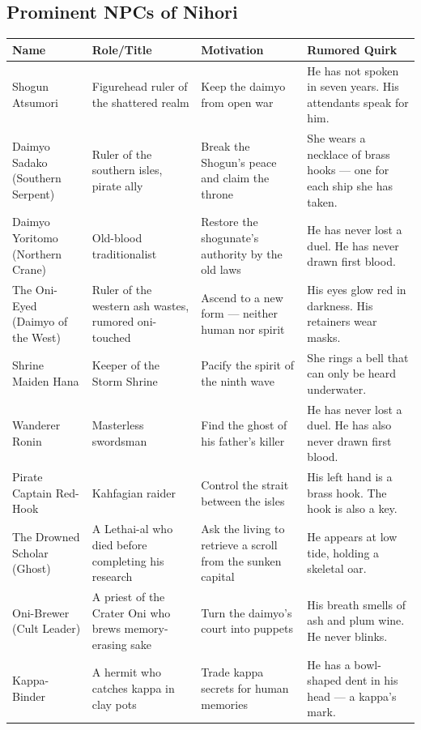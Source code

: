 \subsection*{Prominent NPCs of Nihori}
\label{sec:nihori-npcs}

\begin{longtable}{|p{}|p{}|p{}|p{}|}
\hline
\textbf{Name} & \textbf{Role/Title} & \textbf{Motivation} & \textbf{Rumored Quirk} \\
\hline
Shogun Atsumori & Figurehead ruler of the shattered realm & Keep the daimyo from open war & He has not spoken in seven years. His attendants speak for him. \\
\hline
Daimyo Sadako (Southern Serpent) & Ruler of the southern isles, pirate ally & Break the Shogun's peace and claim the throne & She wears a necklace of brass hooks --- one for each ship she has taken. \\
\hline
Daimyo Yoritomo (Northern Crane) & Old-blood traditionalist & Restore the shogunate's authority by the old laws & He has never lost a duel. He has never drawn first blood. \\
\hline
The Oni-Eyed (Daimyo of the West) & Ruler of the western ash wastes, rumored oni-touched & Ascend to a new form --- neither human nor spirit & His eyes glow red in darkness. His retainers wear masks. \\
\hline
Shrine Maiden Hana & Keeper of the Storm Shrine & Pacify the spirit of the ninth wave & She rings a bell that can only be heard underwater. \\
\hline
Wanderer Ronin & Masterless swordsman & Find the ghost of his father's killer & He has never lost a duel. He has also never drawn first blood. \\
\hline
Pirate Captain Red-Hook & Kahfagian raider & Control the strait between the isles & His left hand is a brass hook. The hook is also a key. \\
\hline
The Drowned Scholar (Ghost) & A Lethai-al who died before completing his research & Ask the living to retrieve a scroll from the sunken capital & He appears at low tide, holding a skeletal oar. \\
\hline
Oni-Brewer (Cult Leader) & A priest of the Crater Oni who brews memory-erasing sake & Turn the daimyo's court into puppets & His breath smells of ash and plum wine. He never blinks. \\
\hline
Kappa-Binder & A hermit who catches kappa in clay pots & Trade kappa secrets for human memories & He has a bowl-shaped dent in his head --- a kappa's mark. \\
\hline
\end{longtable}

